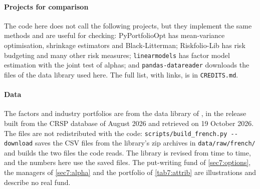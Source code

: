 \begin{chapterrefs}
\paragraph{Projects for comparison}
The code here does not call the following projects, but they implement the same methods and are
useful for checking: PyPortfolioOpt \parencite{pyportfolioopt} has mean-variance optimisation, shrinkage estimators and
Black-Litterman; Riskfolio-Lib \parencite{riskfolio} has risk budgeting and many other risk measures;
\texttt{linearmodels} \parencite{linearmodels} has factor model estimation with the joint test of alphas; and
\texttt{pandas-datareader} \parencite{datareader} downloads the files of the data library used here. The full list, with links, is
in \texttt{CREDITS.md}.

\paragraph{Data}
The factors and industry portfolios are from the data library of \textcite{frenchlib}, in the release
built from the CRSP database of August 2026 and retrieved on 19 October 2026. The files are not redistributed with the code:
\texttt{scripts/build\_french.py -{}-download} saves the CSV files from the library's zip archives
in \texttt{data/raw/french/} and builds the two files the code reads. The library is revised from time
to time, and the numbers here use the saved files. The put-writing fund of \cref{sec7:options}, the
managers of \cref{sec7:alpha} and the portfolio of \cref{tab7:attrib} are illustrations and describe no
real fund.

\end{chapterrefs}
